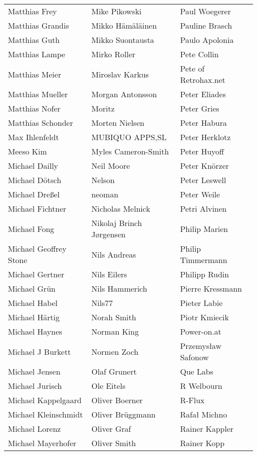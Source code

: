 \begin{tabular}{p{4cm}p{4cm}p{4cm}}
Matthias Frey & Mike Pikowski & Paul Woegerer \\
Matthias Grandis & Mikko Hämäläinen & Pauline Brasch \\
Matthias Guth & Mikko Suontausta & Paulo Apolonia \\
Matthias Lampe & Mirko Roller & Pete Collin \\
Matthias Meier & Miroslav Karkus & Pete of Retrohax.net \\
Matthias Mueller & Morgan Antonsson & Peter Eliades \\
Matthias Nofer & Moritz & Peter Gries \\
Matthias Schonder & Morten Nielsen & Peter Habura \\
Max Ihlenfeldt & MUBIQUO APPS,SL & Peter Herklotz \\
Meeso Kim & Myles Cameron-Smith & Peter Huyoff \\
Michael Dailly & Neil Moore & Peter Knörzer \\
Michael Dötsch & Nelson & Peter Leswell \\
Michael Dreßel & neoman & Peter Weile \\
Michael Fichtner & Nicholas Melnick & Petri Alvinen \\
Michael Fong & Nikolaj Brinch Jørgensen & Philip Marien \\
Michael Geoffrey Stone & Nils Andreas & Philip Timmermann \\
Michael Gertner & Nils Eilers & Philipp Rudin \\
Michael Grün & Nils Hammerich & Pierre Kressmann \\
Michael Habel & Nils77 & Pieter Labie \\
Michael Härtig & Norah Smith & Piotr Kmiecik \\
Michael Haynes & Norman King & Power-on.at \\
Michael J Burkett & Normen Zoch & Przemysław Safonow \\
Michael Jensen & Olaf Grunert & Que Labs \\
Michael Jurisch & Ole Eitels & R Welbourn \\
Michael Kappelgaard & Oliver Boerner & R-Flux \\
Michael Kleinschmidt & Oliver Brüggmann & Rafał Michno \\
Michael Lorenz & Oliver Graf & Rainer Kappler \\
Michael Mayerhofer & Oliver Smith & Rainer Kopp \\

\end{tabular}

